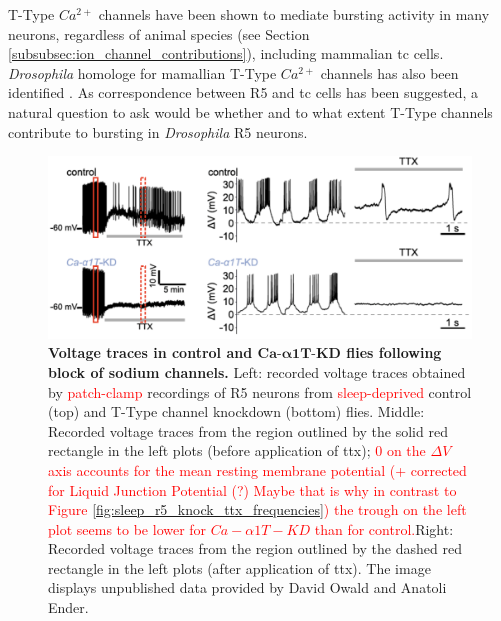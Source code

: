 \documentclass[../main.tex]{subfiles}
\begin{document}
T-Type $Ca^{2+}$ channels have been shown to mediate bursting activity in many neurons, regardless of animal species (see Section \ref{subsubsec:ion_channel_contributions}), including mammalian \gls{tc} cells.  \textit{Drosophila} homologe for mamallian T-Type $Ca^{2+}$ channels has also been identified \cite{jeongCaa1TFlyTtype2015}.
As correspondence between R5 and \gls{tc} cells has been suggested, a natural question to ask would be whether and to what extent T-Type channels contribute to bursting in \textit{Drosophila} R5 neurons.

\begin{figure}[!t]
    \centering
    \includegraphics[width=0.95\linewidth]{../img/sleep_and_r5_network/CaaT_knock_and_ttx/voltage_traces_labelled.png}
    \caption[Voltage traces in control and $Ca\text{-}\alpha1T\text{-KD}$ flies following block of sodium channels]{
        \textbf{Voltage traces in control and $\bm{Ca\text{-}\alpha1T\text{-KD}}$ flies following block of sodium channels.}
        Left: recorded voltage traces obtained by \textcolor{red}{patch-clamp} recordings of R5 neurons from \textcolor{red}{sleep-deprived} control (top) and T-Type channel knockdown (bottom) flies.
        Middle: Recorded voltage traces from the region outlined by the solid red rectangle in the left plots (before application of \gls{ttx}); \textcolor{red}{$0$ on the $\Delta V$ axis accounts for the mean resting membrane potential (+ corrected for Liquid Junction Potential (?) Maybe that is why in contrast to Figure \ref{fig:sleep_r5_knock_ttx_frequencies}) the trough on the left plot seems to be lower for $Ca-\alpha1T-KD$ than for control.}Right: Recorded voltage traces from the region outlined by the dashed red rectangle in the left plots (after application of \gls{ttx}). The image displays unpublished data provided by David Owald and Anatoli Ender.
    }
    \label{fig:sleep_r5_knock_ttx_voltage}
\end{figure}
\end{document}
